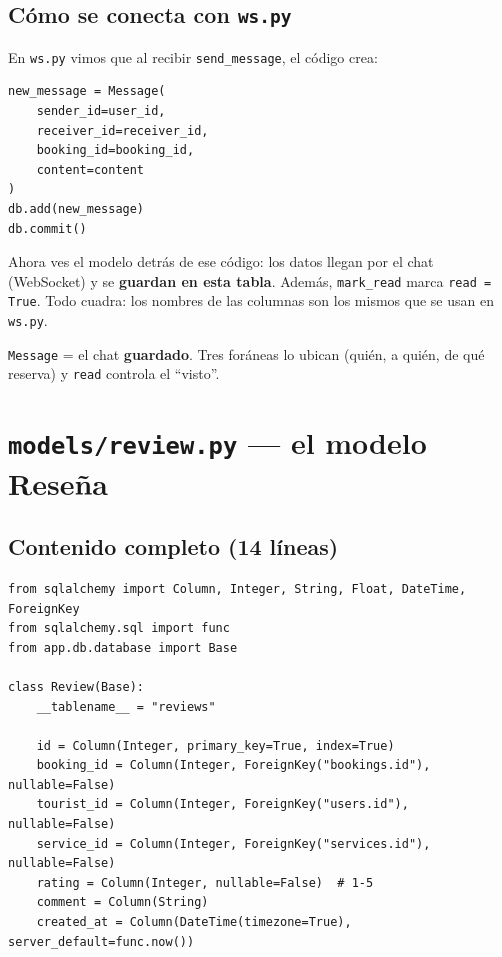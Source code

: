 \documentclass[11pt,a4paper]{article}
\begin{document}
\subsection{Cómo se conecta con \texttt{ws.py}}

En \texttt{ws.py} vimos que al recibir \texttt{send\_message}, el código crea:
\begin{lstlisting}
new_message = Message(
    sender_id=user_id,
    receiver_id=receiver_id,
    booking_id=booking_id,
    content=content
)
db.add(new_message)
db.commit()
\end{lstlisting}

Ahora ves el modelo detrás de ese código: los datos llegan por el chat (WebSocket) y se
\textbf{guardan en esta tabla}. Además, \texttt{mark\_read} marca \texttt{read = True}.
Todo cuadra: los nombres de las columnas son los mismos que se usan en \texttt{ws.py}.

\begin{recuadro}
\texttt{Message} = el chat \textbf{guardado}. Tres foráneas lo ubican (quién, a quién, de qué
reserva) y \texttt{read} controla el ``visto''.
\end{recuadro}

\section{\texttt{models/review.py} --- el modelo Reseña}

\subsection{Contenido completo (14 líneas)}

\begin{lstlisting}
from sqlalchemy import Column, Integer, String, Float, DateTime, ForeignKey
from sqlalchemy.sql import func
from app.db.database import Base

class Review(Base):
    __tablename__ = "reviews"

    id = Column(Integer, primary_key=True, index=True)
    booking_id = Column(Integer, ForeignKey("bookings.id"), nullable=False)
    tourist_id = Column(Integer, ForeignKey("users.id"), nullable=False)
    service_id = Column(Integer, ForeignKey("services.id"), nullable=False)
    rating = Column(Integer, nullable=False)  # 1-5
    comment = Column(String)
    created_at = Column(DateTime(timezone=True), server_default=func.now())
\end{lstlisting}
\end{document}
